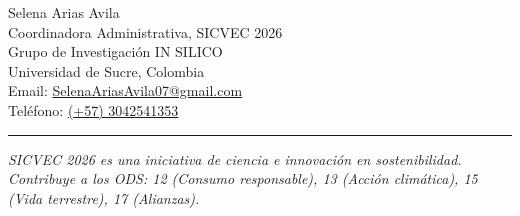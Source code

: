 \documentclass[11pt,a4paper]{article}
\begin{document}
Selena Arias Avila \\
Coordinadora Administrativa, SICVEC 2026 \\
Grupo de Investigación IN SILICO \\
Universidad de Sucre, Colombia \\
Email: \href{mailto:SelenaAriasAvila07@gmail.com}{SelenaAriasAvila07@gmail.com} \\
Teléfono: \href{tel:+573042541353}{(+57) 3042541353}

\vspace{0.3cm}

\noindent
\rule{\textwidth}{0.5pt}

\vspace{0.2cm}

\noindent
\textit{\small SICVEC 2026 es una iniciativa de ciencia e innovación en sostenibilidad. Contribuye a los ODS: 12 (Consumo responsable), 13 (Acción climática), 15 (Vida terrestre), 17 (Alianzas).}
\end{document}
